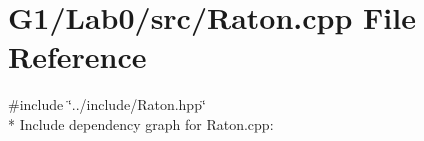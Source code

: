 \section{G1/\+Lab0/src/\+Raton.cpp File Reference}
\label{_raton_8cpp}
{\ttfamily \#include \char`\"{}../include/\+Raton.\+hpp\char`\"{}}\\*
Include dependency graph for Raton.\+cpp\+:
